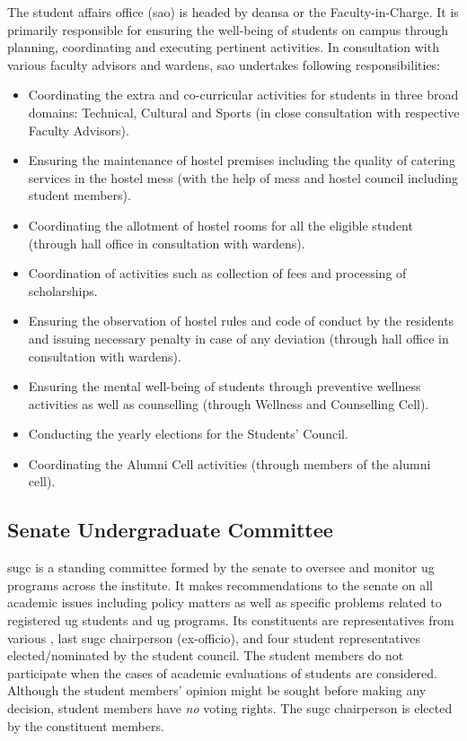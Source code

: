 The student affairs office (\acrshort{sao}) is headed by \acrfull{deansa} or the Faculty-in-Charge. It is primarily responsible for ensuring the well-being of students on campus through planning, coordinating and executing pertinent activities. In consultation with various faculty advisors and wardens, \acrshort{sao} undertakes following responsibilities:

\begin{itemize}[leftmargin=15mm]
	\item Coordinating the extra and co-curricular activities for \glspl{student} in three broad domains: Technical, Cultural and Sports (in close consultation with respective Faculty Advisors).
	\item Ensuring the maintenance of hostel premises including the quality of catering services in the hostel mess (with the help of mess and hostel council including student members).
	\item Coordinating the allotment of hostel rooms for all the eligible \gls{student} (through hall office in consultation with wardens).
	\item Coordination of activities such as collection of fees and processing of scholarships.
	\item Ensuring the observation of hostel rules and code of conduct by the residents and issuing necessary penalty in case of any deviation (through hall office in consultation with wardens).
	\item Ensuring the mental well-being of \glspl{student} through preventive wellness activities as well as counselling (through Wellness and Counselling Cell).
	\item Conducting the yearly elections for the Students’ Council.
	\item Coordinating the Alumni Cell activities (through members of the alumni cell).
\end{itemize}

\subsection{Senate Undergraduate Committee}

\acrfull{sugc} is a standing committee formed by the \gls{senate} to oversee and monitor \acrshort{ug} programs across the \gls{institute}. It makes recommendations to the \gls{senate} on all academic issues including policy matters as well as specific problems related to registered \acrshort{ug} students and \acrshort{ug} programs. Its constituents are representatives from various , last \acrshort{sugc} chairperson (ex-officio), and four student representatives elected/nominated by the student council. The student members do not participate when the cases of academic evaluations of students are considered. Although the student members' opinion might be sought before making any decision, student members have \textit{no} voting rights. The \acrshort{sugc} chairperson is elected by the constituent members. 

